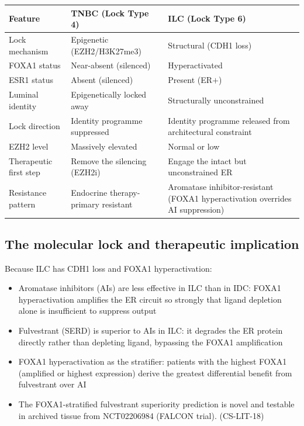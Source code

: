 \documentclass[12pt, a4paper]{article}
\begin{document}
\begin{center}
\begin{tabular}{p{3.5cm}p{5cm}p{5cm}}
\toprule
\textbf{Feature} & \textbf{TNBC (Lock Type 4)}
& \textbf{ILC (Lock Type 6)} \\
\midrule
Lock mechanism
& Epigenetic (EZH2/H3K27me3)
& Structural (CDH1 loss) \\
FOXA1 status
& Near-absent (silenced)
& Hyperactivated \\
ESR1 status
& Absent (silenced)
& Present (ER$+$) \\
Luminal identity
& Epigenetically locked away
& Structurally unconstrained \\
Lock direction
& Identity programme suppressed
& Identity programme released
  from architectural constraint \\
EZH2 level
& Massively elevated
& Normal or low \\
Therapeutic first step
& Remove the silencing (EZH2i)
& Engage the intact but
  unconstrained ER \\
Resistance pattern
& Endocrine therapy-primary
  resistant
& Aromatase inhibitor-resistant
  (FOXA1 hyperactivation
  overrides AI suppression) \\
\bottomrule
\end{tabular}
\end{center}

\subsection{The molecular lock and therapeutic
implication}

Because ILC has CDH1 loss and FOXA1 hyperactivation:
\begin{itemize}[noitemsep]
  \item Aromatase inhibitors (AIs) are less effective
        in ILC than in IDC: FOXA1 hyperactivation
        amplifies the ER circuit so strongly that
        ligand depletion alone is insufficient to
        suppress output
  \item Fulvestrant (SERD) is superior to AIs in ILC:
        it degrades the ER protein directly rather
        than depleting ligand, bypassing the FOXA1
        amplification
  \item FOXA1 hyperactivation as the stratifier:
        patients with the highest FOXA1 (amplified
        or highest expression) derive the greatest
        differential benefit from fulvestrant over AI
  \item The FOXA1-stratified fulvestrant superiority
        prediction is novel and testable in archived
        tissue from NCT02206984 (FALCON trial). (CS-LIT-18)
\end{itemize}
\end{document}
